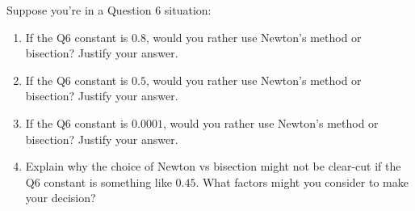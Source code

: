 \documentclass{article}
\begin{document}
\begin{problem}
    Suppose you're in a Question 6 situation:
    \begin{enumerate}
        \item If the Q6 constant is \(0.8\), would you rather use Newton's method or bisection? Justify your answer.
        \item If the Q6 constant is \(0.5\), would you rather use Newton's method or bisection? Justify your answer.
        \item If the Q6 constant is \(0.0001\), would you rather use Newton's method or bisection? Justify your answer.
        \item Explain why the choice of Newton vs bisection might not be clear-cut if the Q6 constant is something like \(0.45\). What factors might you consider to make your decision?
    \end{enumerate}


    
\end{problem}
\end{document}
